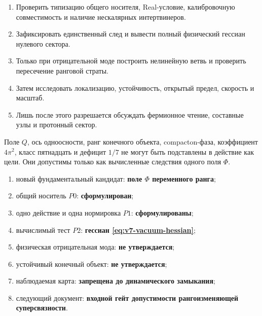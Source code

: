 \begin{enumerate}
 \item Проверить типизацию общего носителя, Real-условие, калибровочную
 совместимость и наличие нескалярных интертвинеров.
 \item Зафиксировать единственный след и вывести полный физический гессиан
 нулевого сектора.
 \item Только при отрицательной моде построить нелинейную ветвь и проверить
 пересечение ранговой страты.
 \item Затем исследовать локализацию, устойчивость, открытый предел,
 скорость и масштаб.
 \item Лишь после этого разрешается обсуждать фермионное чтение, составные
 узлы и протонный сектор.
\end{enumerate}

\begin{nogocriterion}
Поле $Q$, ось одноосности, ранг конечного объекта, compacton-фаза,
коэффициент $4\pi^2$, класс пятнадцать и дефицит $1/7$ не могут быть
подставлены в действие как цели. Они допустимы только как вычисленные
следствия одного поля $\Phi$.
\end{nogocriterion}

\begin{protocol}
\begin{enumerate}
 \item новый фундаментальный кандидат: \textbf{поле $\Phi$ переменного
 ранга};
 \item общий носитель $P0$: \textbf{сформулирован};
 \item одно действие и одна нормировка $P1$: \textbf{сформулированы};
 \item вычислимый тест $P2$: \textbf{гессиан
 \eqref{eq:v7-vacuum-hessian}};
 \item физическая отрицательная мода: \textbf{не утверждается};
 \item устойчивый конечный объект: \textbf{не утверждается};
 \item наблюдаемая карта: \textbf{запрещена до динамического замыкания};
 \item следующий документ: \textbf{входной гейт допустимости
 рангоизменяющей суперсвязности}.
\end{enumerate}
\end{protocol}